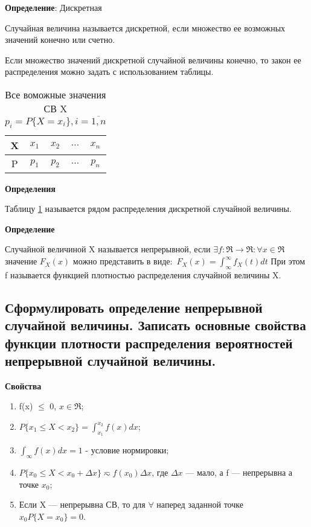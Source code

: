 \textbf{Определение}: Дискретная

Случайная величина называется дискретной, если множество ее возможных значений конечно или счетно.

Если множество значений дискретной случайной величины конечно, то закон ее распределения можно задать с использованием таблицы.
\begin{table}[ht!]
	\begin{center}
		\caption{Все воможные значения СВ X $p_i = P\{X=x_i\}, i = \overline{1,n}$}
		\label{tbl:best}
		\begin{tabular}{|c|c|c|c|c|}
			\hline
			X & $x_1$ & $x_2$ & $\dots$ & $x_n$ \\ 
			\hline
			P & $p_1$ & $p_2$ & $\dots$ & $p_n$ \\
			\hline
		\end{tabular}
	\end{center}
\end{table}

\textbf{Определения}

Таблицу \ref{tbl:best} называется рядом распределения дискретной случайной величины.

\textbf{Определение}

Случайной величиной X называется непрерывной, если $\exists f: \Re \rightarrow \Re: \forall x \in \Re$ значение $F_X(x)$ можно представить в виде:\
$F_X(x) = \int_{\infty}^{\infty} f_X(t)dt$ При этом f называется функцией плотностью распределения случайной величины X.

\subsection{Сформулировать определение непрерывной случайной величины. Записать основные свойства функции плотности распределения вероятностей непрерывной случайной величины.}

\textbf{Свойства}

\begin{enumerate}[label=\arabic*.]
	\item f(x) $\leq$ 0, $x \in \Re$;
	\item $P\{x_1 \leq X < x_2\} = \int_{x_1}^{x_2}f(x)dx$;
	\item $\int_{\infty}f(x)dx = 1$ - условие нормировки;
	\item $P\{x_0 \leq X < x_0 + \Delta x\} \eqsim f(x_0)\Delta x$, где $\Delta x$ --- мало, а f --- непрерывна а точке $x_0$;
	\item Если X --- непрерывна СВ, то для $\forall$ наперед заданной точке $x_0 P\{X=x_0\}=0$.
\end{enumerate}


